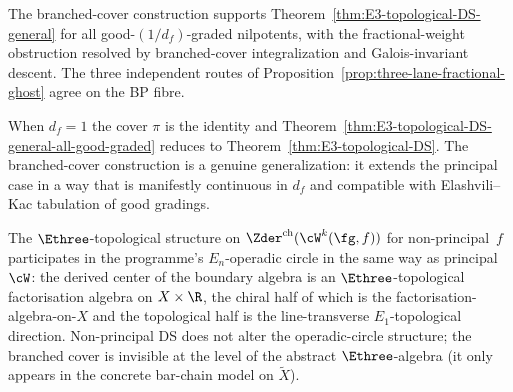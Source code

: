 \begin{remark}[Scope]
\label{rem:fractional-ghost-scope-closed}
The branched-cover construction supports
Theorem~\ref{thm:E3-topological-DS-general} for all
good-$(1/d_{f})$-graded nilpotents, with the fractional-weight
obstruction resolved by branched-cover integralization and
Galois-invariant descent. The three independent routes of
Proposition~\ref{prop:three-lane-fractional-ghost} agree on the BP
fibre.
\end{remark}

\begin{remark}
\label{rem:fractional-ghost-principal-is-trivial-case}
When $d_{f} = 1$ the cover $\pi$ is the identity and
Theorem~\ref{thm:E3-topological-DS-general-all-good-graded}
reduces to Theorem~\ref{thm:E3-topological-DS}. The branched-cover
construction is a genuine generalization: it extends the principal
case in a way that is manifestly continuous in $d_{f}$ and
compatible with Elashvili--Kac tabulation of good gradings.
\end{remark}

\begin{remark}
\label{rem:fractional-ghost-operadic-circle-stability}
The $\Ethree$-topological structure on $\Zder^{\mathrm{ch}}(\cW^{k}(
\fg, f))$ for non-principal~$f$ participates in the programme's
$E_{n}$-operadic circle in the same way as principal~$\cW$: the derived center
of the boundary algebra is an $\Ethree$-topological factorisation
algebra on $X \times \R$, the chiral half of which is the
factorisation-algebra-on-$X$ and the topological half is the
line-transverse $E_1$-topological direction. Non-principal DS does not alter the
operadic-circle structure; the branched cover is invisible at the
level of the abstract $\Ethree$-algebra (it only appears in the
concrete bar-chain model on $\widetilde X$).
\end{remark}

